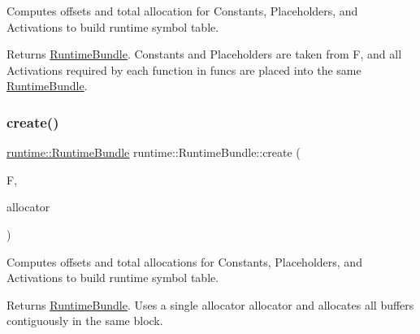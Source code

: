 Computes offsets and total allocation for Constants, Placeholders, and Activations to build runtime symbol table. \begin{DoxyReturn}{Returns}
\hyperlink{classglow_1_1runtime_1_1_runtime_bundle}{Runtime\+Bundle}. Constants and Placeholders are taken from {\ttfamily F}, and all Activations required by each function in {\ttfamily funcs} are placed into the same \hyperlink{classglow_1_1runtime_1_1_runtime_bundle}{Runtime\+Bundle}. 
\end{DoxyReturn}
\mbox{\label{classglow_1_1runtime_1_1_runtime_bundle_a8c6efabf1d72088e473646b7b2a3a25a}} 
\subsubsection{\texorpdfstring{create()}{create()}\hspace{0.1cm}{\footnotesize\ttfamily [3/4]}}
{\footnotesize\ttfamily \hyperlink{classglow_1_1runtime_1_1_runtime_bundle}{runtime\+::\+Runtime\+Bundle} runtime\+::\+Runtime\+Bundle\+::create (\begin{DoxyParamCaption}\item[{const \hyperlink{classglow_1_1_i_r_function}{I\+R\+Function} \&}]{F,  }\item[{\hyperlink{classglow_1_1_memory_allocator}{Memory\+Allocator} \&}]{allocator }\end{DoxyParamCaption})\hspace{0.3cm}{\ttfamily [static]}}

Computes offsets and total allocations for Constants, Placeholders, and Activations to build runtime symbol table. \begin{DoxyReturn}{Returns}
\hyperlink{classglow_1_1runtime_1_1_runtime_bundle}{Runtime\+Bundle}. Uses a single allocator {\ttfamily allocator} and allocates all buffers contiguously in the same block. 
\end{DoxyReturn}
\mbox{\label{classglow_1_1runtime_1_1_runtime_bundle_ab875c4022c4ace24653d5dfb6b55c229}} 
